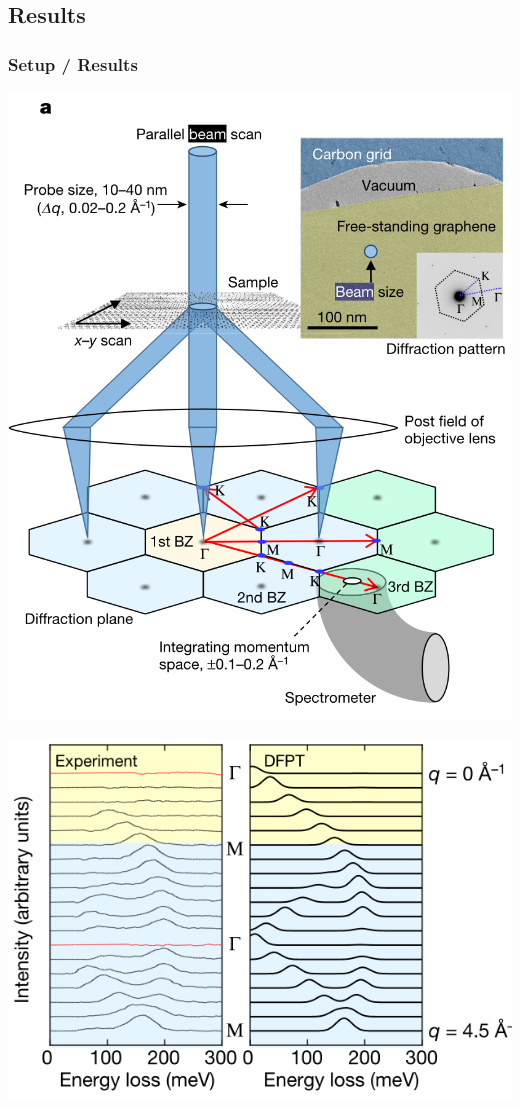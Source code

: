 \documentclass{beamer}
\begin{document}
\begin{frame}
	\subsection{Results}
	\frametitle{Setup / Results}
	\begin{minipage}{0.5\linewidth}
		\includegraphics[width=1\linewidth, keepaspectratio]{Figures/pbs.png}
	\end{minipage}%
	\begin{minipage}{0.5\linewidth}
		\includegraphics[width=1\linewidth, keepapsectratio]{Figures/rmap.png}
	\end{minipage}

\end{frame}
\end{document}
